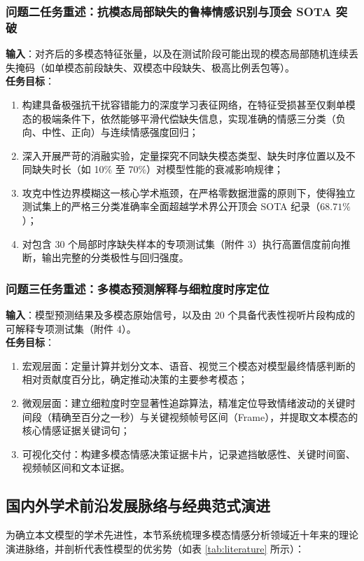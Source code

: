\subsubsection{问题二任务重述：抗模态局部缺失的鲁棒情感识别与顶会 SOTA 突破}
\textbf{输入}：对齐后的多模态特征张量，以及在测试阶段可能出现的模态局部随机连续丢失掩码（如单模态前段缺失、双模态中段缺失、极高比例丢包等）。\\
\textbf{任务目标}：
\begin{enumerate}
    \item 构建具备极强抗干扰容错能力的深度学习表征网络，在特征受损甚至仅剩单模态的极端条件下，依然能够平滑代偿缺失信息，实现准确的情感三分类（负向、中性、正向）与连续情感强度回归；
    \item 深入开展严苛的消融实验，定量探究不同缺失模态类型、缺失时序位置以及不同缺失时长（如 10\% 至 70\%）对模型性能的衰减影响规律；
    \item 攻克中性边界模糊这一核心学术瓶颈，在严格零数据泄露的原则下，使得独立测试集上的严格三分类准确率全面超越学术界公开顶会 SOTA 纪录（$68.71\%$）；
    \item 对包含 30 个局部时序缺失样本的专项测试集（附件 3）执行高置信度前向推断，输出完整的分类极性与回归强度。
\end{enumerate}

\subsubsection{问题三任务重述：多模态预测解释与细粒度时序定位}
\textbf{输入}：模型预测结果及多模态原始信号，以及由 20 个具备代表性视听片段构成的可解释专项测试集（附件 4）。\\
\textbf{任务目标}：
\begin{enumerate}
    \item 宏观层面：定量计算并划分文本、语音、视觉三个模态对模型最终情感判断的相对贡献度百分比，确定推动决策的主要参考模态；
    \item 微观层面：建立细粒度时空显著性追踪算法，精准定位导致情绪波动的关键时间段（精确至百分之一秒）与关键视频帧号区间（Frame），并提取文本模态的核心情感证据关键词句；
    \item 可视化交付：构建多模态情感决策证据卡片，记录遮挡敏感性、关键时间窗、视频帧区间和文本证据。
\end{enumerate}

\subsection{国内外学术前沿发展脉络与经典范式演进}
为确立本文模型的学术先进性，本节系统梳理多模态情感分析领域近十年来的理论演进脉络，并剖析代表性模型的优劣势（如表 \ref{tab:literature} 所示）：

